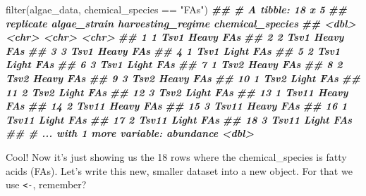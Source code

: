 \documentclass[
]{krantz}
\newenvironment{Shaded}{\begin{snugshade}}{\end{snugshade}}
\newcommand{\DocumentationTok}[1]{\textcolor[rgb]{0.56,0.35,0.01}{\textbf{\textit{#1}}}}
\newcommand{\FunctionTok}[1]{\textcolor[rgb]{0.00,0.00,0.00}{#1}}
\newcommand{\NormalTok}[1]{#1}
\newcommand{\SpecialCharTok}[1]{\textcolor[rgb]{0.00,0.00,0.00}{#1}}
\newcommand{\StringTok}[1]{\textcolor[rgb]{0.31,0.60,0.02}{#1}}
\begin{document}
\begin{Shaded}
\begin{Highlighting}[]
\FunctionTok{filter}\NormalTok{(algae\_data, chemical\_species }\SpecialCharTok{==} \StringTok{"FAs"}\NormalTok{)}
\DocumentationTok{\#\# \# A tibble: 18 x 5}
\DocumentationTok{\#\#    replicate algae\_strain harvesting\_regime chemical\_species}
\DocumentationTok{\#\#        \textless{}dbl\textgreater{} \textless{}chr\textgreater{}        \textless{}chr\textgreater{}             \textless{}chr\textgreater{}           }
\DocumentationTok{\#\#  1         1 Tsv1         Heavy             FAs             }
\DocumentationTok{\#\#  2         2 Tsv1         Heavy             FAs             }
\DocumentationTok{\#\#  3         3 Tsv1         Heavy             FAs             }
\DocumentationTok{\#\#  4         1 Tsv1         Light             FAs             }
\DocumentationTok{\#\#  5         2 Tsv1         Light             FAs             }
\DocumentationTok{\#\#  6         3 Tsv1         Light             FAs             }
\DocumentationTok{\#\#  7         1 Tsv2         Heavy             FAs             }
\DocumentationTok{\#\#  8         2 Tsv2         Heavy             FAs             }
\DocumentationTok{\#\#  9         3 Tsv2         Heavy             FAs             }
\DocumentationTok{\#\# 10         1 Tsv2         Light             FAs             }
\DocumentationTok{\#\# 11         2 Tsv2         Light             FAs             }
\DocumentationTok{\#\# 12         3 Tsv2         Light             FAs             }
\DocumentationTok{\#\# 13         1 Tsv11        Heavy             FAs             }
\DocumentationTok{\#\# 14         2 Tsv11        Heavy             FAs             }
\DocumentationTok{\#\# 15         3 Tsv11        Heavy             FAs             }
\DocumentationTok{\#\# 16         1 Tsv11        Light             FAs             }
\DocumentationTok{\#\# 17         2 Tsv11        Light             FAs             }
\DocumentationTok{\#\# 18         3 Tsv11        Light             FAs             }
\DocumentationTok{\#\# \# ... with 1 more variable: abundance \textless{}dbl\textgreater{}}
\end{Highlighting}
\end{Shaded}

Cool! Now it's just showing us the 18 rows where the chemical\_species is fatty acids (FAs). Let's write this new, smaller dataset into a new object. For that we use \texttt{\textless{}-}, remember?
\end{document}
